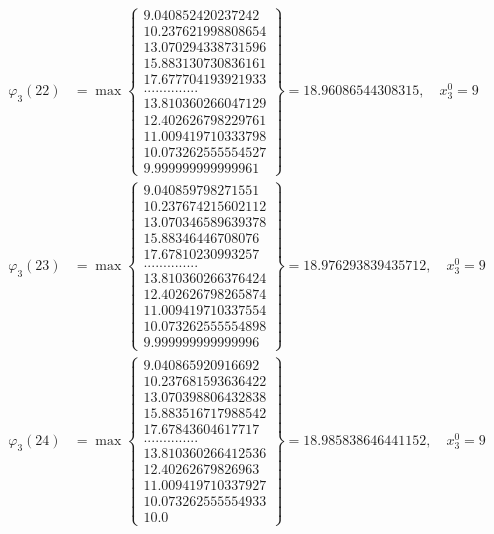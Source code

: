\documentclass{article}
\begin{document}
\begin{align*}
  
  
  
\varphi_{3}(22) &= \max \left\{ \begin{array}{c}
9.040852420237242 \\
 10.237621998808654 \\
 13.070294338731596 \\
 15.883130730836161 \\
 17.677704193921933 \\
 .............. \\
 13.810360266047129 \\
 12.402626798229761 \\
 11.009419710333798 \\
 10.073262555554527 \\
 9.999999999999961
\end{array} \right\} = 18.96086544308315, \quad x_{3}^0 = 9\\
  
  
  
  
\varphi_{3}(23) &= \max \left\{ \begin{array}{c}
9.040859798271551 \\
 10.237674215602112 \\
 13.070346589639378 \\
 15.88346446708076 \\
 17.67810230993257 \\
 .............. \\
 13.810360266376424 \\
 12.402626798265874 \\
 11.009419710337554 \\
 10.073262555554898 \\
 9.999999999999996
\end{array} \right\} = 18.976293839435712, \quad x_{3}^0 = 9\\
  
  
  
  
\varphi_{3}(24) &= \max \left\{ \begin{array}{c}
9.040865920916692 \\
 10.237681593636422 \\
 13.070398806432838 \\
 15.883516717988542 \\
 17.67843604617717 \\
 .............. \\
 13.810360266412536 \\
 12.40262679826963 \\
 11.009419710337927 \\
 10.073262555554933 \\
 10.0
\end{array} \right\} = 18.985838646441152, \quad x_{3}^0 = 9\\
  

\end{align*}
\end{document}
